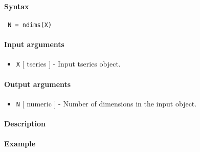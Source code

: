 


	\paragraph{Syntax}
 
 \begin{verbatim}
 N = ndims(X)
 \end{verbatim}
 
 \paragraph{Input arguments}
 
 \begin{itemize}
 \item
   \texttt{X} {[} tseries {]} - Input tseries object.
 \end{itemize}
 
 \paragraph{Output arguments}
 
 \begin{itemize}
 \item
   \texttt{N} {[} numeric {]} - Number of dimensions in the input object.
 \end{itemize}
 
 \paragraph{Description}
 
 \paragraph{Example}


